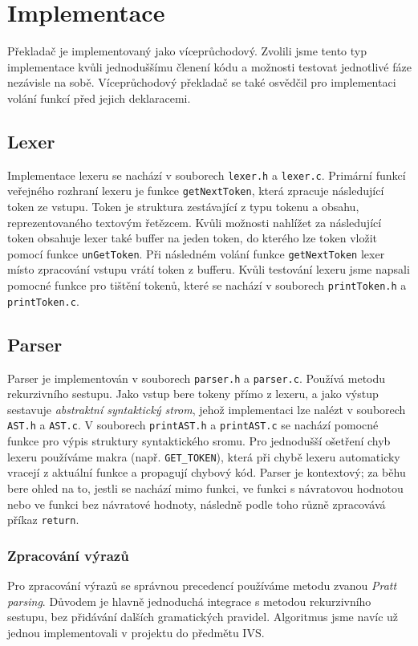 \section{Implementace}
Překladač je implementovaný jako víceprůchodový.
Zvolili jsme tento typ implementace kvůli jednoduššímu členení kódu a možnosti testovat jednotlivé fáze nezávisle na sobě.
Víceprůchodový překladač se také osvědčil pro implementaci volání funkcí před jejich deklaracemi.

\subsection{Lexer}
Implementace lexeru se nachází v souborech \texttt{lexer.h} a \texttt{lexer.c}.
Primární funkcí veřejného rozhraní lexeru je funkce \texttt{getNextToken},
která zpracuje následující token ze vstupu.
Token je struktura zestávající z typu tokenu a obsahu, reprezentovaného textovým řetězcem.
Kvůli možnosti nahlížet za následující token obsahuje lexer také buffer na jeden token,
do kterého lze token vložit pomocí funkce \texttt{unGetToken}.
Při následném volání funkce \texttt{getNextToken} lexer místo zpracování vstupu vrátí token z bufferu.
Kvůli testování lexeru jsme napsali pomocné funkce pro tištění tokenů,
které se nachází v souborech \texttt{printToken.h} a \texttt{printToken.c}.

\subsection{Parser}
Parser je implementován v souborech \texttt{parser.h} a \texttt{parser.c}.
Používá metodu rekurzivního sestupu.
Jako vstup bere tokeny přímo z lexeru, a jako výstup sestavuje \textit{abstraktní syntaktický strom},
jehož implementaci lze nalézt v souborech \texttt{AST.h} a \texttt{AST.c}.
V souborech \texttt{printAST.h} a \texttt{printAST.c} se nachází pomocné funkce pro výpis struktury syntaktického sromu.
Pro jednodušší ošetření chyb lexeru používáme makra (např. \texttt{GET\_TOKEN}),
která při chybě lexeru automaticky vracejí z aktuální funkce a propagují chybový kód.
Parser je kontextový; za běhu bere ohled na to, jestli se nachází mimo funkci,
ve funkci s návratovou hodnotou nebo ve funkci bez návratové hodnoty,
následně podle toho různě zpracovává příkaz \texttt{return}.

\subsubsection{Zpracování výrazů}
Pro zpracování výrazů se správnou precedencí používáme metodu zvanou \textit{Pratt parsing}.
Důvodem je hlavně jednoduchá integrace s metodou rekurzivního sestupu, bez přidávání dalších gramatických pravidel.
Algoritmus jsme navíc už jednou implementovali v projektu do předmětu IVS.

